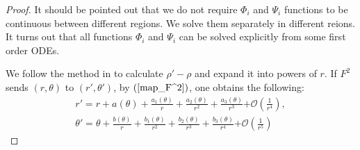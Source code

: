 \documentclass{article}
\numberwithin{figure}{section}
\numberwithin{equation}{section}
\theoremstyle{remark}
\theoremstyle{definition}
\begin{document}
	{\color{red}
    \begin{proof}It should be pointed out that we do not require \(\Phi_{i}\) and \(\Psi_{i}\) functions to be
continuous between different regions. We solve them separately in different reions. It turns out that all functions \(\Phi_{i}\) and \(\Psi_{i}\) can be solved explicitly from some first order ODEs. 
	
	We follow the method in \cite{dolgopyat_unbounded_2009} to calculate \(\rho' - \rho\) and expand
	it into powers of \(r\).
    If $F^2$ sends $(r,\theta)$ to $(r',\theta')$, by $(\ref{map_F^2})$, one obtains the following:
    \begin{align*}
    r'=r + a(\theta) + \frac{a_{1}(\theta)}{r} + \frac{a_{2}(\theta)}{r^{2}}+\frac{a_3(\theta)}{r^3}\mathcal{+ O}\left( \frac{1}{r^{4}}\right),\\
    \theta'=	\theta + \frac{b(\theta)}{r} + \frac{b_{1}(\theta)}{r^{2}} + \frac{b_{2}(\theta)}{r^{3}}+\frac{b_3(\theta)}{r^4}\mathcal{+ O}\left( \frac{1}{r^{5}} \right)
    \end{align*}


\end{proof}}
\end{document}
